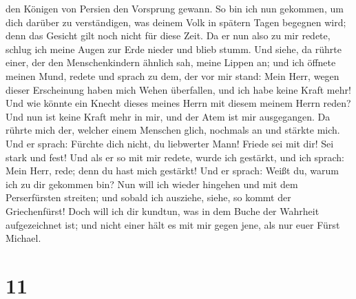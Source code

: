 den Königen von Persien den Vorsprung gewann.  So bin ich
nun gekommen, um dich darüber zu verständigen, was deinem Volk in
spätern Tagen begegnen wird; denn das Gesicht gilt noch nicht für diese
Zeit.  Da er nun also zu mir redete, schlug ich meine
Augen zur Erde nieder und blieb stumm.  Und siehe, da
rührte einer, der den Menschenkindern ähnlich sah, meine Lippen an; und
ich öffnete meinen Mund, redete und sprach zu dem, der vor mir stand:
Mein Herr, wegen dieser Erscheinung haben mich Wehen überfallen, und ich
habe keine Kraft mehr!  Und wie könnte ein Knecht dieses
meines Herrn mit diesem meinem Herrn reden? Und nun ist keine Kraft mehr
in mir, und der Atem ist mir ausgegangen.  Da rührte mich
der, welcher einem Menschen glich, nochmals an und stärkte mich.
 Und er sprach: Fürchte dich nicht, du liebwerter Mann!
Friede sei mit dir! Sei stark und fest! Und als er so mit mir redete,
wurde ich gestärkt, und ich sprach: Mein Herr, rede; denn du hast mich
gestärkt!  Und er sprach: Weißt du, warum ich zu dir
gekommen bin? Nun will ich wieder hingehen und mit dem Perserfürsten
streiten; und sobald ich ausziehe, siehe, so kommt der Griechenfürst!
 Doch will ich dir kundtun, was in dem Buche der Wahrheit
aufgezeichnet ist; und nicht einer hält es mit mir gegen jene, als nur
euer Fürst Michael.

\hypertarget{section-10}{%
\section{11}\label{section-10}}

